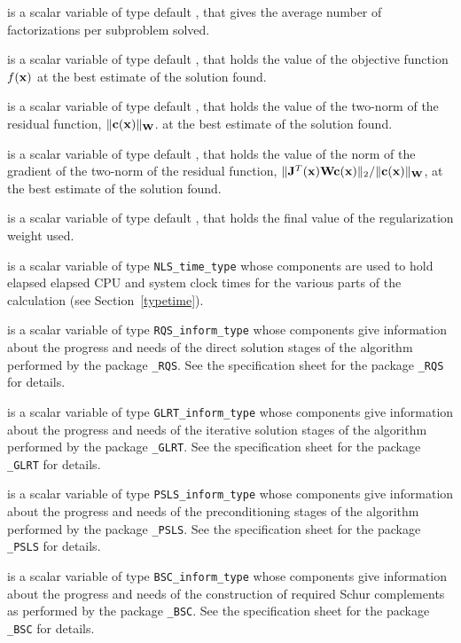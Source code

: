 \documentclass{galahad}
\newcommand{\packagename}{NLS}
\begin{document}
\begin{description}
 is a scalar variable of type default \realdp, that
gives the average number of factorizations per subproblem solved.

 is a scalar variable of type default \realdp, that holds the
value of the objective function $f({\mathbf{x}})$  at the best estimate
of the solution found.

 is a scalar variable of type default \realdp, that holds the
value of the two-norm of the residual function, $\|{\mathbf{c}}({\mathbf{x}})\|_{{\mathbf{W}}}$.
at the best estimate of the solution found.

 is a scalar variable of type default \realdp, that holds the
value of the norm of the gradient of the two-norm of the residual function,
$\|{\mathbf{J}}^T({\mathbf{x}}) {\mathbf{W}} {\mathbf{c}}({\mathbf{x}})\|_2/\|{\mathbf{c}}({\mathbf{x}})\|_{{\mathbf{W}}}$, at the best estimate
of the solution found.

 is a scalar variable of type default \realdp, that holds the
final value of the regularization weight used.

 is a scalar variable of type {\tt \packagename\_time\_type}
whose components are used to hold elapsed elapsed CPU and system clock
times for the various parts of the calculation (see Section~\ref{typetime}).

 is a scalar variable of type
{\tt RQS\_inform\_type}
whose components give information about the progress and needs
of the direct solution stages of the algorithm performed by the package
{\tt \libraryname\_RQS}.
See the specification sheet for the package
{\tt \libraryname\_RQS}
for details.

 is a scalar variable of type
{\tt GLRT\_inform\_type}
whose components give information about the progress and needs
of the iterative solution stages of the algorithm performed by the package
{\tt \libraryname\_GLRT}.
See the specification sheet for the package
{\tt \libraryname\_GLRT}
for details.

 is a scalar variable of type
{\tt PSLS\_inform\_type}
whose components give information about the progress and needs
of the preconditioning stages of the algorithm performed by the package
{\tt \libraryname\_PSLS}.
See the specification sheet for the package
{\tt \libraryname\_PSLS} for details.

 is a scalar variable of type
{\tt BSC\_inform\_type}
whose components give information about the progress and needs
of the construction of required Schur complements
as performed by the package
{\tt \libraryname\_BSC}.
See the specification sheet for the package
{\tt \libraryname\_BSC} for details.


\end{description}
\end{document}
